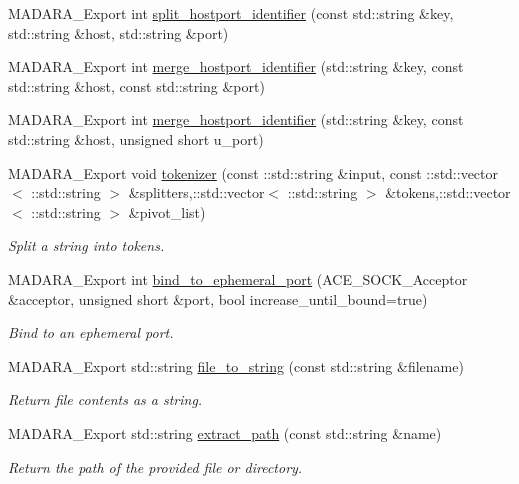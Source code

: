 \begin{DoxyCompactItemize}
MADARA\_\-Export int \hyperlink{namespaceMadara_1_1Utility_aeda9e0110b3afac610ca2fc2b1970c7c}{split\_\-hostport\_\-identifier} (const std::string \&key, std::string \&host, std::string \&port)
\item 
MADARA\_\-Export int \hyperlink{namespaceMadara_1_1Utility_a3639a23c623c792e9d741365318801ab}{merge\_\-hostport\_\-identifier} (std::string \&key, const std::string \&host, const std::string \&port)
\item 
MADARA\_\-Export int \hyperlink{namespaceMadara_1_1Utility_aa3e90ad426a4dea4bdfb7e0e7ce6a486}{merge\_\-hostport\_\-identifier} (std::string \&key, const std::string \&host, unsigned short u\_\-port)
\item 
MADARA\_\-Export void \hyperlink{namespaceMadara_1_1Utility_a7bdc56f64d7849871c43eb24f4ad1854}{tokenizer} (const ::std::string \&input, const ::std::vector$<$ ::std::string $>$ \&splitters,::std::vector$<$ ::std::string $>$ \&tokens,::std::vector$<$ ::std::string $>$ \&pivot\_\-list)
\begin{DoxyCompactList}\small\item\em Split a string into tokens. \item\end{DoxyCompactList}\item 
MADARA\_\-Export int \hyperlink{namespaceMadara_1_1Utility_a89cd4486ff2558f5b316d5c71c1f4cfb}{bind\_\-to\_\-ephemeral\_\-port} (ACE\_\-SOCK\_\-Acceptor \&acceptor, unsigned short \&port, bool increase\_\-until\_\-bound=true)
\begin{DoxyCompactList}\small\item\em Bind to an ephemeral port. \item\end{DoxyCompactList}\item 
MADARA\_\-Export std::string \hyperlink{namespaceMadara_1_1Utility_a3e01e45acda976146faaf013596159ac}{file\_\-to\_\-string} (const std::string \&filename)
\begin{DoxyCompactList}\small\item\em Return file contents as a string. \item\end{DoxyCompactList}\item 
MADARA\_\-Export std::string \hyperlink{namespaceMadara_1_1Utility_ad9561e92035daa290c5f8ad569f0cc3c}{extract\_\-path} (const std::string \&name)
\begin{DoxyCompactList}\small\item\em Return the path of the provided file or directory. \item\end{DoxyCompactList}\item 

\end{DoxyCompactItemize}
